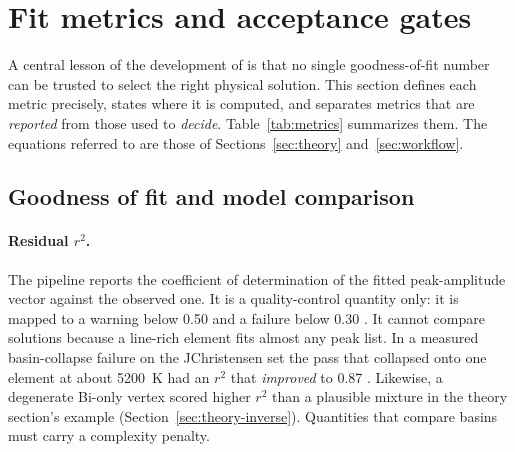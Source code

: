 \section{Fit metrics and acceptance gates}
\label{sec:metrics}

A central lesson of the development of \alibz{} is that no single goodness-of-fit number can be trusted to select the right physical solution. This section defines each metric precisely, states where it is computed, and separates metrics that are \emph{reported} from those used to \emph{decide}. Table~\ref{tab:metrics} summarizes them. The equations referred to are those of Sections~\ref{sec:theory} and~\ref{sec:workflow}.

\subsection{Goodness of fit and model comparison}

\paragraph{Residual $r^2$.}
The pipeline reports the coefficient of determination of the fitted peak-amplitude vector against the observed one. It is a quality-control quantity only: it is mapped to a warning below 0.50 and a failure below 0.30 %
. It cannot compare solutions because a line-rich element fits almost any peak list. In a measured basin-collapse failure on the JChristensen set the pass that collapsed onto one element at about \SI{5200}{\kelvin} had an $r^2$ that \emph{improved} to 0.87 %
. Likewise, a degenerate Bi-only vertex scored higher $r^2$ than a plausible mixture in the theory section's example (Section~\ref{sec:theory-inverse}). Quantities that compare basins must carry a complexity penalty.

